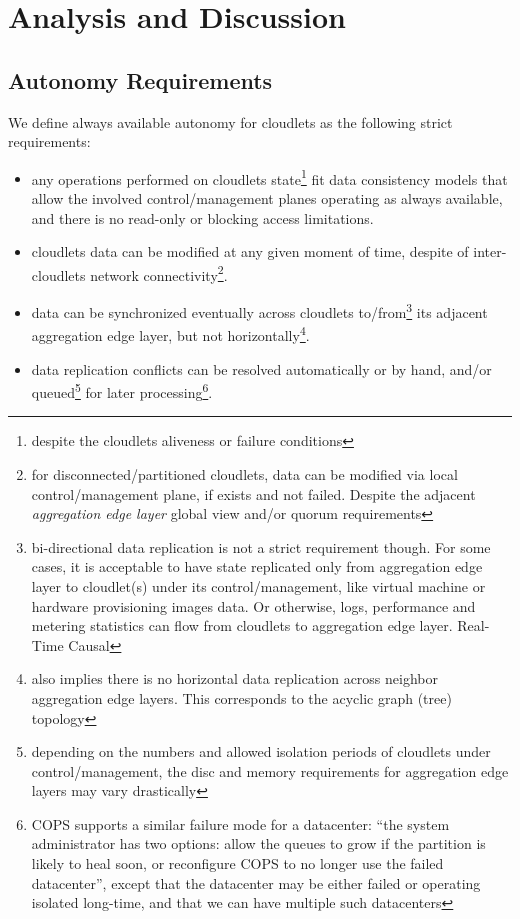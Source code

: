 \documentclass[conference]{IEEEtran}
\begin{document}
\section{Analysis and Discussion}

\subsection{Autonomy Requirements}

We define always available autonomy for cloudlets as the following strict
requirements:

\begin{itemize}
  \item any operations performed on cloudlets state\footnote{despite the
    cloudlets aliveness or failure conditions} fit data consistency models that
    allow the involved control/management planes operating as always available,
    and there is no read-only or blocking access limitations.
  \item cloudlets data can be modified at any given moment of time, despite of
    inter-cloudlets network connectivity\footnote{for disconnected/partitioned
    cloudlets, data can be modified via local control/management plane, if
    exists and not failed. Despite the adjacent \textit{aggregation edge
    layer}\cite{b3} global view and/or quorum requirements}.
  \item data can be synchronized eventually across cloudlets
    to/from\footnote{bi-directional data replication is not a strict
    requirement though. For some cases, it is acceptable to have state
    replicated only from aggregation edge layer to cloudlet(s) under its
    control/management, like virtual machine or hardware provisioning images
    data. Or otherwise, logs, performance and metering statistics can flow from
    cloudlets to aggregation edge layer. Real-Time Causal } its adjacent aggregation edge layer,
    but not horizontally\footnote{also implies there is no horizontal data
    replication across neighbor aggregation edge layers. This corresponds to
    the acyclic graph (tree) topology}.
  \item data replication conflicts can be resolved automatically or by hand,
    and/or queued\footnote{depending on the numbers and allowed isolation
    periods of cloudlets under control/management, the disc and memory
    requirements for aggregation edge layers may vary drastically} for later
    processing\footnote{COPS\cite{b1} supports a similar failure mode for a
    datacenter: ``the system administrator has two options: allow the queues to
    grow if the partition is likely to heal soon, or reconfigure COPS to no
    longer use the failed datacenter'', except that the datacenter may be
    either failed or operating isolated long-time, and that we can have
    multiple such datacenters}.
\end{itemize}
\end{document}
